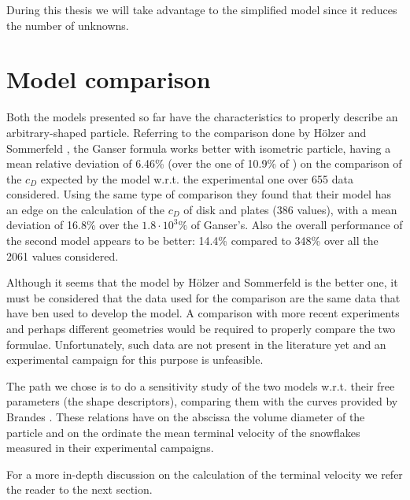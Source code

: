 		During this thesis we will take advantage to the simplified model since it reduces the number of unknowns.
		

	\section{Model comparison}
		Both the models presented so far have the characteristics to properly describe an arbitrary-shaped particle. Referring to the comparison done by H\"{o}lzer and Sommerfeld \cite{HoltzerSommerfeld-2008}, the Ganser formula works better with isometric particle, having a mean relative deviation of 6.46\% (over the one of 10.9\% of ) on the comparison of the $ c_D $ expected by the model w.r.t. the experimental one over 655 data considered. Using the same type of comparison they found that their model has an edge on the calculation of the $ c_D $ of disk and plates (386 values), with a mean deviation of 16.8\% over the $ 1.8 \cdot 10^3 \% $ of Ganser's. Also the overall performance of the second model appears to be better: 14.4\% compared to 348\% over all the 2061 values considered. 
		
		Although it seems that the model by H\"{o}lzer and Sommerfeld is the better one, it must be considered that the data used for the comparison are the same data that have ben used to develop the model. A comparison with more recent experiments and perhaps different geometries would be required to properly compare the two formulae. Unfortunately, such data are not present in the literature yet and an experimental campaign for this purpose is unfeasible. 
		
		The path we chose is to do a sensitivity study of the two models w.r.t. their free parameters (the shape descriptors), comparing them with the curves provided by Brandes \cite{BrandesIkedEtAl-2008}. These relations have on the abscissa the volume diameter of the particle and on the ordinate the mean terminal velocity of the snowflakes measured in their experimental campaigns. 
	
		For a more in-depth discussion on the calculation of the terminal velocity we refer the reader to the next section. 
	
